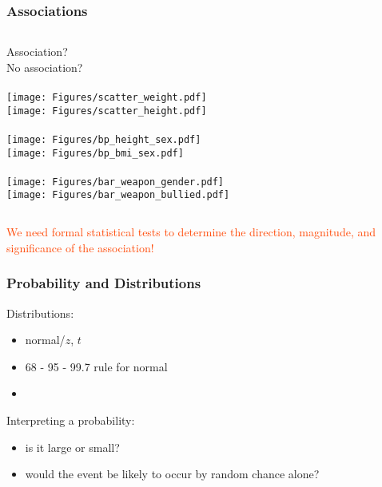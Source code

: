 \begin{frame}[label=associations]
\frametitle{Associations}
\begin{columns}
\vskip20pt
Association? \\
\vskip40pt
No association?
\\
\\
\texttt{[image: Figures/scatter\_weight.pdf]}\\
\texttt{[image: Figures/scatter\_height.pdf]}
\\
\\
\texttt{[image: Figures/bp\_height\_sex.pdf]}\\
\texttt{[image: Figures/bp\_bmi\_sex.pdf]}
\\
\\
\texttt{[image: Figures/bar\_weapon\_gender.pdf]}\\
\texttt{[image: Figures/bar\_weapon\_bullied.pdf]}
\end{columns}
\begin{center}
\textcolor{OrangeRed}{\small{We need formal statistical tests to determine the direction, magnitude, and significance of the association!}}
\end{center}
\begin{flushright}
\hyperlink{topics}{}
\end{flushright}
\end{frame}



\begin{frame}[label=probability]
\frametitle{Probability and Distributions}
Distributions:
    \begin{itemize}
        \item
        normal/$z$, $t$%
        \item
        68 - 95 - 99.7 rule for normal
        \item[]
    \end{itemize}
  Interpreting a probability:
    \begin{itemize}
        \item
        is it large or small?
        \item
        would the event be likely to occur by random chance alone?
    \end{itemize}
\begin{flushright}
\hyperlink{topics}{}
\end{flushright}
\end{frame}


